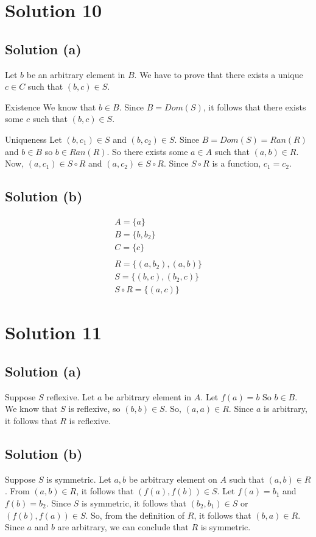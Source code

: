 \documentclass{article}
\begin{document}
\section{Solution 10}
\subsection{Solution (a)}
Let $b$ be an arbitrary element in $B$. We have to prove that there
exists a unique $c \in C$ such that $(b,c) \in S$.

Existence
We know that $b \in B$. Since $B = Dom(S)$, it follows that there
exists some $c$ such that $(b,c) \in S$.

Uniqueness
Let $(b,c_1) \in S$ and $(b,c_2) \in S$. Since $B = Dom(S) = Ran(R)$
and $b \in B$ so $b \in Ran(R)$. So there exists some $a \in A$ such
that $(a,b) \in R$. Now, $(a,c_1) \in S \circ R$ and $(a,c_2) \in S
\circ R$. Since $S \circ R$ is a function, $c_1 = c_2$.

\subsection{Solution (b)}
\begin{align*}
  A = \{a\} \\
  B = \{b, b_2\} \\
  C = \{c\} \\ \\
  R = \{(a,b_2), (a,b)\} \\
  S = \{(b,c), (b_2, c)\} \\
  S \circ R = \{(a,c)\}
\end{align*}

\section{Solution 11}
\subsection{Solution (a)}
Suppose $S$ reflexive. Let $a$ be arbitrary element in $A$. Let $f(a)
= b$ So $b \in B$. We know that $S$ is reflexive, so $(b,b) \in S$.
So, $(a,a) \in R$. Since $a$ is arbitrary, it follows that $R$ is
reflexive.

\subsection{Solution (b)}
Suppose $S$ is symmetric. Let $a,b$ be arbitrary element on $A$ such
that $(a,b) \in R$. From $(a,b) \in R$, it follows that $(f(a), f(b))
\in S$. Let $f(a) = b_1$ and $f(b) = b_2$. Since $S$ is symmetric, it
follows that $(b_2, b_1) \in S$ or $(f(b), f(a)) \in S$. So, from the
definition of $R$, it follows that $(b,a) \in R$. Since $a$ and $b$
are arbitrary, we can conclude that $R$ is symmetric.
\end{document}
